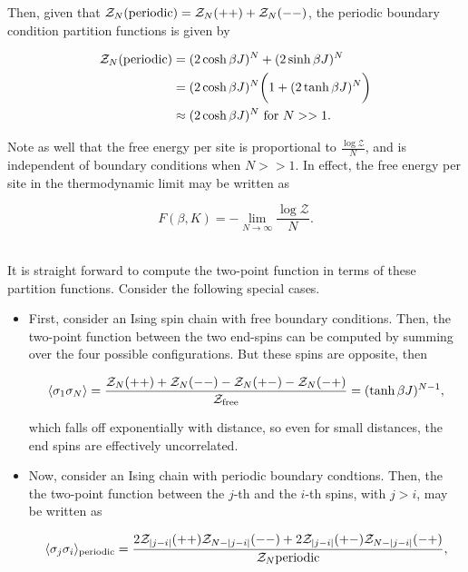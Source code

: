 \documentclass{homework}
\begin{document}
\begin{itemize}
    Then, given that $\mathcal{Z}_N(\textnormal{periodic}) = \mathcal{Z}_N(++) + \mathcal{Z}_N(--)$, the periodic boundary condition partition functions is given by 
    
    \begin{equation*}
        \begin{split}
          \mathcal{Z}_N(\textnormal{periodic}) &= (2\cosh \beta J)^N + (2\sinh \beta J)^N \\
          &= (2\cosh \beta J)^N \bigg(1+ (2\tanh \beta J)^N\bigg) \\
          &\approx (2\cosh \beta J)^N \textnormal{ for } N >> 1. 
        \end{split}
    \end{equation*}
\end{itemize}

Note as well that the free energy per site is proportional to $\frac{\log \mathcal{Z}}{N}$, and is independent of boundary conditions when $N >> 1$. In effect, the free energy per site in the thermodynamic limit may be written as

\begin{equation}
    F(\beta, K) = - \lim_{N \rightarrow \infty} \frac{\log \mathcal{Z}}{N}.
\end{equation}

\blanky \\

It is straight forward to compute the two-point function in terms of these partition functions. Consider the following special cases.

\begin{itemize}
    \item First, consider an Ising spin chain with free boundary conditions. Then, the two-point function between the two end-spins can be computed by summing over the four possible configurations. But these spins are opposite, then 

\begin{equation}
    \langle \sigma_1 \sigma_N \rangle = \frac{\mathcal{Z}_N(++) + \mathcal{Z}_N(--) - \mathcal{Z}_N(+-) - \mathcal{Z}_N(-+)}{\mathcal{Z}_{\textnormal{free}}} =
    (\tanh \beta J)^{N-1},
    \end{equation}
    
   which falls off exponentially with distance, so even for small distances, the end spins are effectively uncorrelated.
  \\
   \item Now, consider an Ising chain with periodic boundary condtions. Then, the the two-point function between the $j$-th and the $i$-th spins, with $j>i$, may be written as

    \begin{equation}
       \langle \sigma_j \sigma_i \rangle_{\textnormal{periodic}} =  \frac{2 \mathcal{Z}_{|j-i|}(++)\mathcal{Z}_{N-|j-i|}(--) + 2\mathcal{Z}_{|j-i|}(+-) \mathcal{Z}_{N-|j-i|}(-+)}{\mathcal{Z}_N{\textnormal{periodic}}},
    \end{equation}
\end{itemize}
\end{document}
